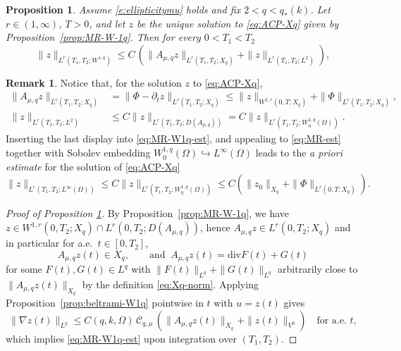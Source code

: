 \documentclass[12pt,leqno]{amsart}
\def\pt {{\partial_t}}
\newtheorem{proposition}[theorem]{Proposition}
\theoremstyle{definition}
\newtheorem{remark}[theorem]{Remark}
\numberwithin{equation}{section}
\numberwithin{figure}{section}
\begin{document}
\begin{proposition} 
\label{prop:first-order-smoothing-MR}
Assume \eqref{e:ellipticitymu} holds and   fix $2<q<q_*(k)$.
Let $r\in(1,\infty)$, $T>0$, and let $z$ be the unique solution to \eqref{eq:ACP-Xq} given by
Proposition~\ref{prop:MR-W-1q}. Then for every $0<T_1<T_2$ 
\begin{equation}\label{eq:MR-W1q-est}
\|z\|_{L^r(T_1,T_2;W^{1,q})}
\le C\,
\left(\|A_{\mu,q}z\|_{L^r(T_1,T_2;X_q)}+\|z\|_{L^r(T_1,T_2;L^2)}\right),
\end{equation}
\end{proposition}
\begin{remark} \label{rem:29} Notice that, for the solution $z$ to \eqref{eq:ACP-Xq},
\[
\begin{split}
 \|A_{\mu,q}z\|_{L^r(T_1,T_2;X_q)}&=\|\Phi-\pt z\|_{L^r(T_1,T_2;X_q)} \leq \|z\|_{W^{1,r}(0,T;X_q)}+ \| \Phi\|_{L^r(T_1,T_2;X_q)},  \\  \|z\|_{L^r(T_1,T_2;L^2)} &\leq C \|z\|_{L^r(T_1,T_2;D(A_{\mu,q}))} =C \|z\|_{L^r(T_1,T_2;W_0^{1,q}(\Omega))}.
 \end{split}
\]
Inserting the last display into  \eqref{eq:MR-W1q-est}, and  appealing to \eqref{eq:MR-est} together with Sobolev embedding $W^{1,q}_0(\Omega)\hookrightarrow L^\infty(\Omega)$ leads to the \emph{a priori estimate} for the solution of \eqref{eq:ACP-Xq}
\begin{equation}\label{eq:MR-Linfty-est}
\|z\|_{L^r(T_1,T_2;L^\infty(\Omega))}
\le C \|z\|_{L^r(T_1,T_2;W^{1,q}_0(\Omega))} \leq C \left(\|z_0\|_{X_q}+\|\Phi\|_{L^r(0,T;X_q)}\right).
\end{equation}
\end{remark}
\begin{proof}[Proof of Proposition \ref{prop:first-order-smoothing-MR}]
By  Proposition~\ref{prop:MR-W-1q}, we have
$z\in W^{1,r}(0,T_2;X_q)\cap  L^r(0,T_2;D(A_{\mu,q}))$, hence
$A_{\mu,q}z\in L^r(0,T_2;X_q)$ and in particular for a.e.\ $t\in [0,T_2]$,
\[
A_{\mu,q}z(t)\in X_q,\qquad \text{and } \ A_{\mu,q}z(t)={\mathrm{div}} F(t)+G(t)
\]
for some $F(t),G(t)\in L^q$ with $\|F(t)\|_{L^q}+\|G(t)\|_{L^q}$ arbitrarily close to
$\|A_{\mu,q}z(t)\|_{X_q}$ by the definition \eqref{eq:Xq-norm}.
Applying Proposition~\ref{prop:beltrami-W1q} pointwise in $t$ with $u=z(t)$ gives
\[
\|\nabla z(t)\|_{L^q}
\le C(q,k,\Omega)\,\mathcal C_{q,\mu}\,
\left(\|A_{\mu,q}z(t)\|_{X_q}+\|z(t)\|_{V^0}\right)
\quad\text{for a.e.\ }t,
\]
which implies \eqref{eq:MR-W1q-est} upon integration over $(T_1,T_2)$.
\end{proof}
\end{document}
